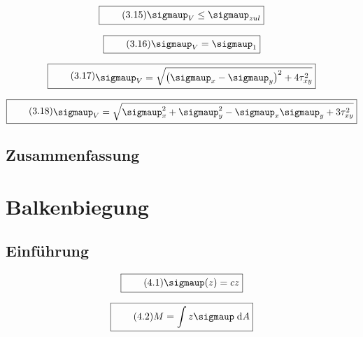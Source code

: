\documentclass[11pt]{article}
\newcommand{\1}{ {\mathds{1}} }
\renewcommand{\sigma  }{\sigmaup   }
\begin{document}
		\begin{equation}
			\boxed{
				\tag{3.15}
				\begin{split}
					\sigma_V \leq \sigma_{zul}
				\end{split}
			}
		\end{equation}

		\begin{equation}
			\boxed{
				\tag{3.16}
				\begin{split}
					\sigma_V= \sigma_1
				\end{split}
			}
		\end{equation}

		\begin{equation}
			\boxed{
				\tag{3.17}
				\begin{split}
					\sigma_V= \sqrt{ \left( \sigma_x - \sigma_y \right)^2 + 4\tau^2_{xy} }
				\end{split}
			}
		\end{equation}

		\begin{equation}
			\boxed{
				\tag{3.18}
				\begin{split}
					\sigma_V= \sqrt{\sigma_x^2 + \sigma_y^2 -\sigma_x\sigma_y + 3\tau^2_{xy} }
				\end{split}
			}
		\end{equation}

		\subsection{Zusammenfassung}

		\section{Balkenbiegung}
		\subsection{Einführung}

		\begin{equation}
			\boxed{
				\tag{4.1}
				\begin{split}
					\sigma(z) = c z
				\end{split}
			}
		\end{equation}

		\begin{equation}
			\boxed{
				\tag{4.2}
				\begin{split}
					M = \int{z\sigma \; \text{d}A}
				\end{split}
			}
		\end{equation}
\end{document}
